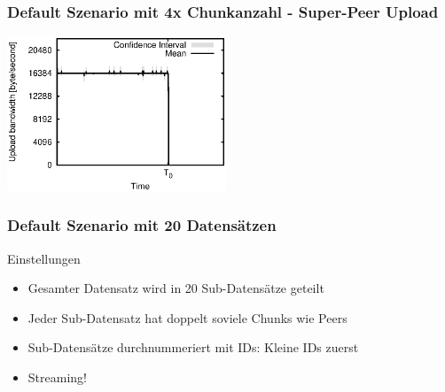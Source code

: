\begin{frame}
  \frametitle{Default Szenario mit 4x Chunkanzahl - Super-Peer Upload}
  \begin{center}
    \includegraphics[width=0.49\textwidth]{fig/plots/scenario_15_chunk_count_fac_4/plots/GeneratedMeanCurrentSuperSeederUploadBandwidth.csv.eps}
  \end{center}
\end{frame}



\begin{frame}
  \frametitle{Default Szenario mit 20 Datensätzen}
  \begin{block}{Einstellungen}
	  \begin{itemize}  
	    \item Gesamter Datensatz wird in 20 Sub-Datensätze geteilt
	    \vspace{2mm}
	    \item Jeder Sub-Datensatz hat doppelt soviele Chunks wie Peers
	    \vspace{2mm}
	    \item Sub-Datensätze durchnummeriert mit IDs: Kleine IDs zuerst
	    \vspace{2mm}
	    \item Streaming!
	  \end{itemize}		
  \end{block}
\end{frame}

